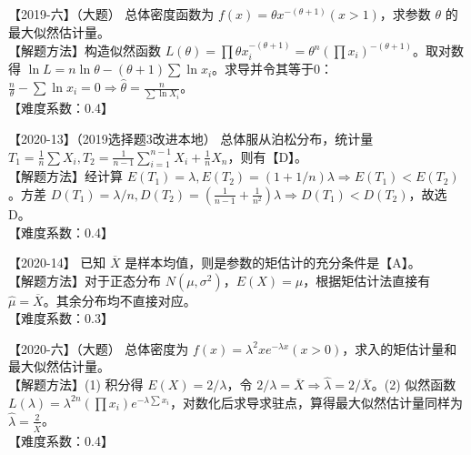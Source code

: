 \documentclass[zihao=4, a4paper, fontset=mac]{ctexart}
\begin{document}
\par\vspace{\baselineskip}

【2019-六】（大题） 总体密度函数为 $f(x)=\theta x^{-(\theta+1)} (x>1)$，求参数 $\theta$ 的最大似然估计量。\\
【解题方法】构造似然函数 $L(\theta)=\prod \theta x_i^{-(\theta+1)} = \theta^n (\prod x_i)^{-(\theta+1)}$。取对数得 $\ln L = n\ln\theta - (\theta+1)\sum \ln x_i$。求导并令其等于0：$\frac{n}{\theta} - \sum \ln x_i = 0 \Rightarrow \widehat{\theta} = \frac{n}{\sum \ln X_i}$。\\
【难度系数：0.4】

\par\vspace{\baselineskip}

【2020-13】（2019选择题3改进本地） 总体服从泊松分布，统计量 $T_1=\frac{1}{n}\sum X_i, T_2=\frac{1}{n-1}\sum_{i=1}^{n-1}X_i + \frac{1}{n}X_n$，则有【D】。\\
【解题方法】经计算 $E(T_1)=\lambda, E(T_2)=(1+1/n)\lambda \Rightarrow E(T_1)<E(T_2)$。方差 $D(T_1)=\lambda/n, D(T_2)=(\frac{1}{n-1}+\frac{1}{n^2})\lambda \Rightarrow D(T_1)<D(T_2)$，故选D。\\
【难度系数：0.4】

\par\vspace{\baselineskip}

【2020-14】 已知 $\overline{X}$ 是样本均值，则是参数的矩估计的充分条件是【A】。\\
【解题方法】对于正态分布 $N(\mu,\sigma^2)$，$E(X)=\mu$，根据矩估计法直接有 $\widehat{\mu}=\overline{X}$。其余分布均不直接对应。\\
【难度系数：0.3】

\par\vspace{\baselineskip}

【2020-六】（大题） 总体密度为 $f(x)=\lambda^2 x e^{-\lambda x} (x>0)$，求入的矩估计量和最大似然估计量。\\
【解题方法】(1) 积分得 $E(X)=2/\lambda$，令 $2/\lambda = \overline{X} \Rightarrow \widehat{\lambda} = 2/\overline{X}$。(2) 似然函数 $L(\lambda) = \lambda^{2n}(\prod x_i)e^{-\lambda\sum x_i}$，对数化后求导求驻点，算得最大似然估计量同样为 $\widehat{\lambda} = \frac{2}{\overline{X}}$。\\
【难度系数：0.4】

\par\vspace{\baselineskip}
\end{document}
